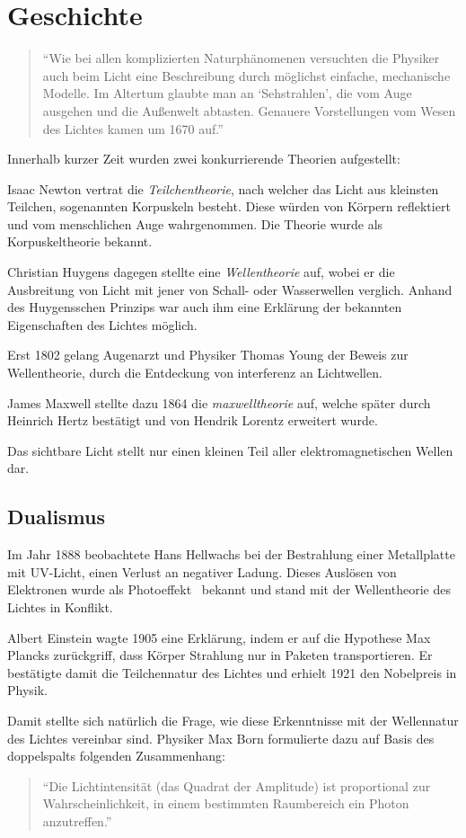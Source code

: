 \section{Geschichte}
\begin{quote}
\enquote{Wie bei allen komplizierten Naturphänomenen versuchten die Physiker auch beim Licht eine Beschreibung durch möglichst einfache, mechanische Modelle. Im Altertum glaubte man an \enquote{Sehstrahlen}, die vom Auge ausgehen und die Außenwelt abtasten. Genauere Vorstellungen vom Wesen des Lichtes kamen um 1670 auf.} \cite[S. 221]{physik1}
\end{quote}

Innerhalb kurzer Zeit wurden zwei konkurrierende Theorien aufgestellt:
\begin{outline}
	\1 Isaac Newton vertrat die \textit{Teilchentheorie}, nach welcher das Licht aus kleinsten Teilchen, sogenannten Korpuskeln besteht. Diese würden von Körpern reflektiert und vom menschlichen Auge wahrgenommen. Die Theorie wurde als Korpuskeltheorie bekannt.
	
	\1 Christian Huygens dagegen stellte eine \textit{Wellentheorie} auf, wobei er die Ausbreitung von Licht mit jener von Schall- oder Wasserwellen verglich. Anhand des Huygensschen Prinzips war auch ihm eine Erklärung der bekannten Eigenschaften des Lichtes möglich.
\end{outline}

Erst 1802 gelang Augenarzt und Physiker Thomas Young der Beweis zur Wellentheorie, durch die Entdeckung von \gls{interferenz} an Lichtwellen.

James Maxwell stellte dazu 1864 die \textit{\gls{maxwelltheorie}} auf, welche später durch Heinrich Hertz bestätigt und von Hendrik Lorentz erweitert wurde.

Das sichtbare Licht stellt nur einen kleinen Teil aller elektromagnetischen Wellen dar.

\subsection{Dualismus}
Im Jahr 1888 beobachtete Hans Hellwachs bei der Bestrahlung einer Metallplatte mit UV-Licht, einen Verlust an negativer Ladung. Dieses Auslösen von Elektronen wurde als Photoeffekt~%
bekannt und stand mit der Wellentheorie des Lichtes in Konflikt.

Albert Einstein wagte 1905 eine Erklärung, indem er auf die Hypothese Max Plancks zurückgriff, dass Körper Strahlung nur in Paketen transportieren. Er bestätigte damit die Teilchennatur des Lichtes und erhielt 1921 den Nobelpreis in Physik.

Damit stellte sich natürlich die Frage, wie diese Erkenntnisse mit der Wellennatur des Lichtes vereinbar sind. Physiker Max Born formulierte dazu auf Basis des \glspl{doppelspalt} folgenden Zusammenhang:
\begin{quote}
\enquote{Die Lichtintensität (das Quadrat der Amplitude) ist proportional zur Wahrscheinlichkeit, in einem bestimmten Raumbereich ein Photon anzutreffen.} \cite[S. 183]{physik2}
\end{quote}